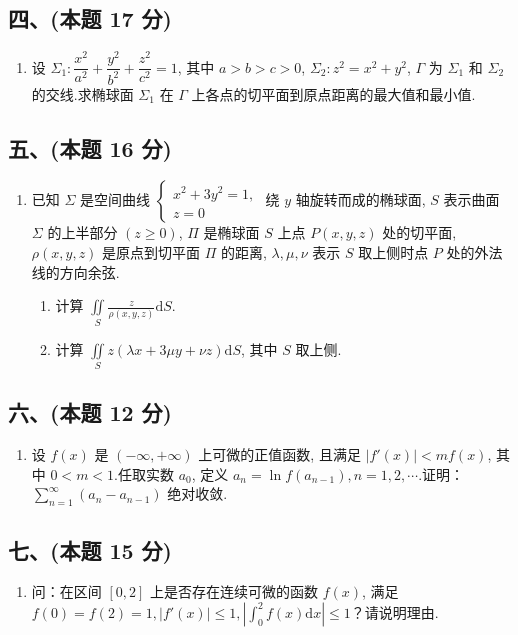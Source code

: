 \subsection*{四、(本题 17 分)}
\begin{enumerate}[start=6]
    \item 设 $\Sigma_1: \dfrac{x^2}{a^2}+\dfrac{y^2}{b^2}+\dfrac{z^2}{c^2}=1$, 其中 $a>b>c>0$, $\Sigma_2: z^2=x^2+y^2$, $\Gamma$ 为 $\Sigma_1$ 和 $\Sigma_2$ 的交线.求椭球面 $\Sigma_1$ 在 $\Gamma$ 上各点的切平面到原点距离的最大值和最小值.
\end{enumerate}

\subsection*{五、(本题 16 分)}
\begin{enumerate}[start=7]
    \item 已知 $\Sigma$ 是空间曲线 $\left\{\begin{array}{l}
                  x^2+3y^2=1, \\
                  z=0
              \end{array}\right.$ 绕 $y$ 轴旋转而成的椭球面, $S$ 表示曲面 $\Sigma$ 的上半部分 $(z\geqslant 0)$, $\Pi$ 是椭球面 $S$ 上点 $P(x,y,z)$ 处的切平面, $\rho(x,y,z)$ 是原点到切平面 $\Pi$ 的距离, $\lambda, \mu, \nu$ 表示 $S$ 取上侧时点 $P$ 处的外法线的方向余弦.
          \begin{enumerate}
              \item[(1)] 计算 $\displaystyle\iint\limits_{S}\frac{z}{\rho(x,y,z)}\mathrm{d}S$.
              \item[(2)] 计算 $\displaystyle\iint\limits_{S}z(\lambda x+3\mu y+\nu z)\mathrm{d}S$, 其中 $S$ 取上侧.
          \end{enumerate}
\end{enumerate}

\subsection*{六、(本题 12 分)}
\begin{enumerate}[start=8]
    \item 设 $f(x)$ 是 $(-\infty,+\infty)$ 上可微的正值函数, 且满足 $|f'(x)|<mf(x)$, 其中 $0<m<1$.任取实数 $a_0$, 定义 $a_n=\ln f(a_{n-1}), n=1,2,\cdots$.证明：
          $\displaystyle\sum_{n=1}^{\infty}(a_n-a_{n-1}) \text{ 绝对收敛}.$
\end{enumerate}

\subsection*{七、(本题 15 分)}
\begin{enumerate}[start=9]
    \item 问：在区间 $[0,2]$ 上是否存在连续可微的函数 $f(x)$, 满足 $f(0)=f(2)=1, |f'(x)|\leqslant 1, \left|\displaystyle\int_0^2 f(x)\mathrm{d}x\right|\leqslant 1$？请说明理由.
\end{enumerate}


